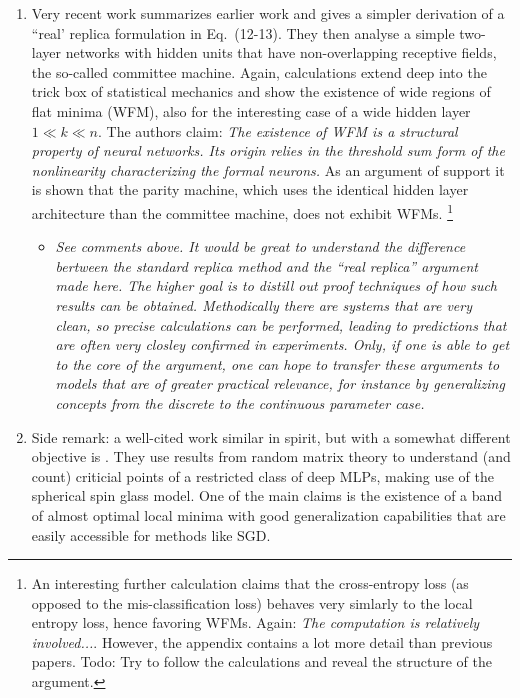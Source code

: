 \documentclass[10pt,a4paper]{article}
\begin{document}
\begin{enumerate}
\begin{itemize}
\end{itemize}
\item 
Very recent work \cite{baldassi2019shaping} summarizes earlier work and gives a simpler derivation of a ``real'   replica formulation in Eq.~(12-13). They then analyse a simple two-layer networks with hidden units that have non-overlapping receptive fields, the so-called committee machine. Again, calculations extend deep into the trick box of statistical mechanics and show the existence of wide regions of flat minima (WFM), also for the interesting case of a wide hidden layer $1 \ll k \ll n$.  The authors claim: \textit{The existence of WFM is a structural property of neural networks. Its origin relies in the threshold sum form of the nonlinearity characterizing the formal neurons.} As an argument of support it is shown that the parity machine, which uses the identical hidden layer architecture than the committee machine, does not exhibit WFMs. \footnote{An interesting further calculation claims that the cross-entropy loss (as opposed to the mis-classification loss) behaves very simlarly to the local entropy loss, hence favoring WFMs. Again: \textit{The computation is relatively involved...}. However, the appendix contains a lot more detail than previous papers. Todo: Try to follow the calculations and reveal the structure of the argument.} 
\begin{itemize}
\item \textit{See comments above. It would be great to understand the difference bertween the standard replica method and the ``real replica'' argument made here. The higher goal is to distill out proof techniques of how such results can be obtained. Methodically there are systems that are very clean, so precise calculations can be performed, leading to predictions that are often very closley confirmed in experiments. Only, if one is able to get to the core of the argument, one can hope to transfer these arguments to models that are of greater practical relevance, for instance by generalizing concepts from the discrete to the continuous parameter case. }
\end{itemize}
%
\item Side remark: a well-cited work similar in spirit, but with a somewhat different objective is \cite{choromanska2015loss}. They use results from random matrix theory to understand (and count) criticial points of a restricted class of deep MLPs, making use of the spherical spin glass model. One of the main claims is the existence of a band of almost optimal local minima with good generalization capabilities that are easily accessible for methods like SGD.

\end{enumerate}
\end{document}
